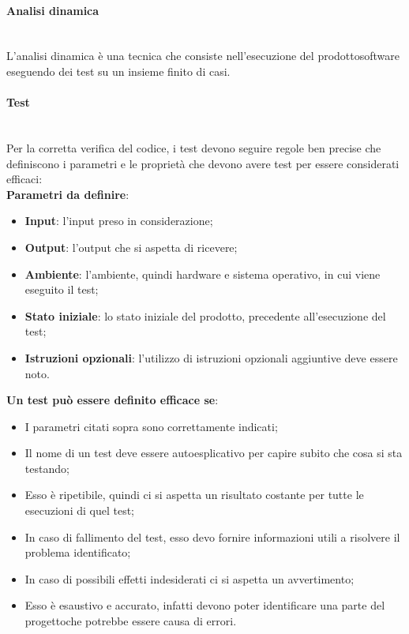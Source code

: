 \paragraph*{Analisi dinamica} \mbox{}\\ [1mm]
L'analisi dinamica è una tecnica che consiste nell'esecuzione del prodotto\glosp software eseguendo dei test su un insieme finito di casi.
\paragraph{Test}\mbox{}\\ [1mm]
Per la corretta verifica del codice, i test devono seguire regole ben precise che definiscono i parametri e le proprietà che devono avere test per essere considerati efficaci: \mbox{}\\ [1mm]
\textbf{Parametri da definire}:
\begin{itemize}
	\item \textbf{Input}: l'input preso in considerazione;
	\item \textbf{Output}: l'output che si aspetta di ricevere;
	\item \textbf{Ambiente}: l'ambiente, quindi hardware e sistema operativo, in cui viene eseguito il test;
	\item \textbf{Stato iniziale}: lo stato iniziale del prodotto\glo, precedente all'esecuzione del test;
	\item \textbf{Istruzioni opzionali}: l'utilizzo di istruzioni opzionali aggiuntive deve essere noto.
\end{itemize} 
\textbf{Un test può essere definito efficace se}:
\begin{itemize}
	\item I parametri citati sopra sono correttamente indicati;
	\item Il nome di un test deve essere autoesplicativo per capire subito che cosa si sta testando;
	\item Esso è ripetibile, quindi ci si aspetta un risultato costante per tutte le esecuzioni di quel test;
	\item In caso di fallimento del test, esso devo fornire informazioni utili a risolvere il problema identificato;
	\item In caso di possibili effetti indesiderati ci si aspetta un avvertimento;
	\item Esso è esaustivo e accurato, infatti devono poter identificare una parte del progetto\glosp che potrebbe essere causa di errori.
\end{itemize}
